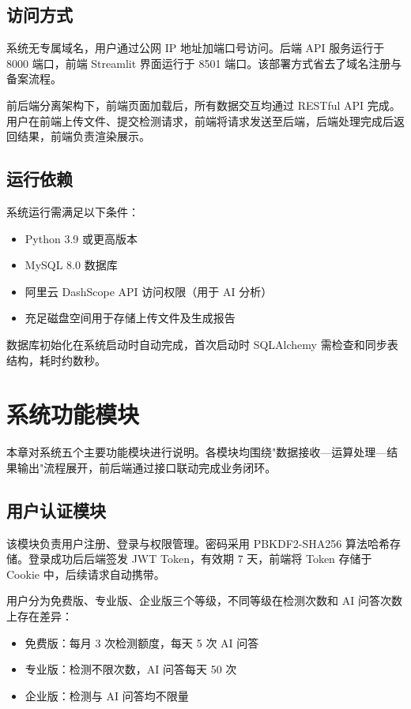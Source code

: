 \documentclass[12pt,a4paper]{ctexart}
\begin{document}
\subsection{访问方式}

系统无专属域名，用户通过公网 IP 地址加端口号访问。后端 API 服务运行于 8000 端口，前端 Streamlit 界面运行于 8501 端口。该部署方式省去了域名注册与备案流程。

前后端分离架构下，前端页面加载后，所有数据交互均通过 RESTful API 完成。用户在前端上传文件、提交检测请求，前端将请求发送至后端，后端处理完成后返回结果，前端负责渲染展示。

\subsection{运行依赖}

系统运行需满足以下条件：

\begin{itemize}
    \item Python 3.9 或更高版本
    \item MySQL 8.0 数据库
    \item 阿里云 DashScope API 访问权限（用于 AI 分析）
    \item 充足磁盘空间用于存储上传文件及生成报告
\end{itemize}

数据库初始化在系统启动时自动完成，首次启动时 SQLAlchemy 需检查和同步表结构，耗时约数秒。

\newpage

\section{系统功能模块}

本章对系统五个主要功能模块进行说明。各模块均围绕"数据接收—运算处理—结果输出"流程展开，前后端通过接口联动完成业务闭环。

\subsection{用户认证模块}

该模块负责用户注册、登录与权限管理。密码采用 PBKDF2-SHA256 算法哈希存储。登录成功后后端签发 JWT Token，有效期 7 天，前端将 Token 存储于 Cookie 中，后续请求自动携带。

用户分为免费版、专业版、企业版三个等级，不同等级在检测次数和 AI 问答次数上存在差异：

\begin{itemize}
    \item 免费版：每月 3 次检测额度，每天 5 次 AI 问答
    \item 专业版：检测不限次数，AI 问答每天 50 次
    \item 企业版：检测与 AI 问答均不限量
\end{itemize}
\end{document}

